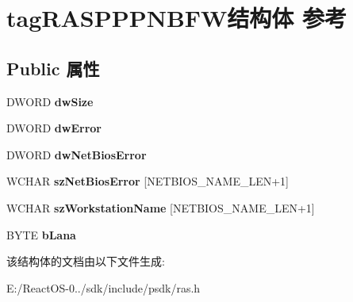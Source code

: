 \hypertarget{structtag_r_a_s_p_p_p_n_b_f_w}{}\section{tag\+R\+A\+S\+P\+P\+P\+N\+B\+F\+W结构体 参考}
\label{structtag_r_a_s_p_p_p_n_b_f_w}
\subsection*{Public 属性}
\begin{DoxyCompactItemize}
\item 
\mbox{\label{structtag_r_a_s_p_p_p_n_b_f_w_ac04e8a45ee68c9d807112cc444ec5a3d}} 
D\+W\+O\+RD {\bfseries dw\+Size}
\item 
\mbox{\label{structtag_r_a_s_p_p_p_n_b_f_w_a86c65086df608d440b4666fd8fa3fe04}} 
D\+W\+O\+RD {\bfseries dw\+Error}
\item 
\mbox{\label{structtag_r_a_s_p_p_p_n_b_f_w_a86cafd52dd89d10f3d5f2585da0cf254}} 
D\+W\+O\+RD {\bfseries dw\+Net\+Bios\+Error}
\item 
\mbox{\label{structtag_r_a_s_p_p_p_n_b_f_w_a50f9c86bba0274020a90ec02ee139ffa}} 
W\+C\+H\+AR {\bfseries sz\+Net\+Bios\+Error} \mbox{[}N\+E\+T\+B\+I\+O\+S\+\_\+\+N\+A\+M\+E\+\_\+\+L\+EN+1\mbox{]}
\item 
\mbox{\label{structtag_r_a_s_p_p_p_n_b_f_w_a4fa4985bc5026c326aea5692d04f7c21}} 
W\+C\+H\+AR {\bfseries sz\+Workstation\+Name} \mbox{[}N\+E\+T\+B\+I\+O\+S\+\_\+\+N\+A\+M\+E\+\_\+\+L\+EN+1\mbox{]}
\item 
\mbox{\label{structtag_r_a_s_p_p_p_n_b_f_w_abf858adadb2501020cde03996de72b60}} 
B\+Y\+TE {\bfseries b\+Lana}
\end{DoxyCompactItemize}


该结构体的文档由以下文件生成\+:\begin{DoxyCompactItemize}
\item 
E\+:/\+React\+O\+S-\/0../sdk/include/psdk/ras.\+h\end{DoxyCompactItemize}
